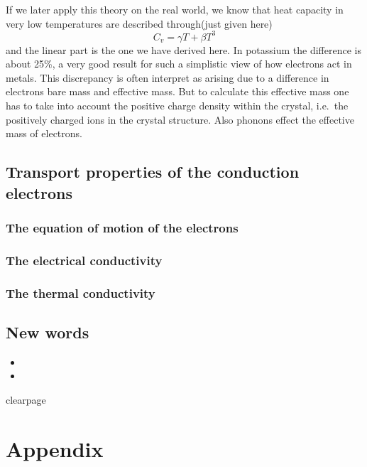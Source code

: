 \documentclass[11pt]{article}
\begin{document}
If we later apply this theory on the real world, we know that heat capacity in very low temperatures are described through(just given here)
\begin{equation}
	C_v = \gamma T + \beta T^3
\end{equation}
and the linear part is the one we have derived here. In potassium the difference is about 25\%, a very good result for such a simplistic view of how electrons act in metals. This discrepancy is often interpret as arising due to a difference in electrons bare mass and effective mass. But to calculate this effective mass one has to take into account the positive charge density within the crystal, i.e.\ the positively charged ions in the crystal structure. Also phonons effect the effective mass of electrons. 
\subsection{Transport properties of the conduction electrons}



\subsubsection{The equation of motion of the electrons}
\subsubsection{The electrical conductivity}
\subsubsection{The thermal conductivity}

\newpage
\subsection{New words}
\begin{itemize}
	\item 
	\item
\end{itemize}
\newpage

\newpage
clearpage
\appendix
\section{Appendix}
\end{document}
